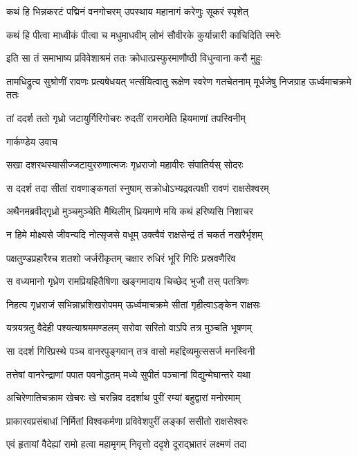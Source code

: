 \twolineshloka
{कथं हि भिन्नकरटं पद्मिनं वनगोचरम्}
{उपस्थाय महानागं करेणुः सूकरं स्पृशेत्}


\twolineshloka
{कथं हि पीत्वा माध्वीकं पीत्वा च मधुमाधवीम्}
{लोभं सौवीरके कुर्यान्नारी काचिदिति स्मरेः}


\twolineshloka
{इति सा तं समाभाष्य प्रविवेशाश्रमं ततः}
{क्रोधात्प्रस्फुरमाणौष्ठी विधुन्वाना करौ मुहुः}


तामधिद्रुत्य सुश्रोणीं रावणः प्रत्यषेधयत्
\twolineshloka
{भर्त्सयित्वातु रूक्षेण स्वरेण गतचेतनाम्}
{मूर्धजेषु निजग्राह ऊर्ध्वमाचक्रमे ततः}


\twolineshloka
{तां ददर्श ततो गृध्रो जटायुर्गिरिगोचरः}
{रुदतीं रामरामेति हियमाणां तपस्विनीम्}


\twolineshloka
{गार्कण्डेय उवाच}
{}


\twolineshloka
{सखा दशरथस्यासीज्जटायुररुणात्मजः}
{गृध्रराजो महावीरः संपातिर्यस् सोदरः}


\twolineshloka
{स ददर्श तदा सीतां रावणाङ्कगतां स्नुषाम्}
{सक्रोधोऽभ्यद्रवत्पक्षी रावणं राक्षसेश्वरम्}


\twolineshloka
{अथैनमब्रवीद्गृध्रो मुञ्चमुञ्चेति मैथिलीम्}
{ध्रियमाणे मयि कथं हरिष्यसि निशाचर}


\twolineshloka
{न हिमे मोक्ष्यसे जीवन्यदि नोत्सृजसे वधूम्}
{उक्त्वैवं राक्षसेन्द्रं तं चकर्त नखरैर्भृशम्}


\twolineshloka
{पक्षतुण्डप्रहारैश्च शतशो जर्जरीकृतम्}
{चक्षार रुधिरं भूरि गिरिः प्रस्रवणैरिव}


\twolineshloka
{स वध्यमानो गृध्रेण रामप्रियहितैषिणा}
{खङ्गमादाय चिच्छेद भुजौ तस् पतत्रिणः}


\twolineshloka
{निहत्य गृध्रराजं सभिन्नाभ्रशिखरोपमम्}
{ऊर्ध्वमाचक्रमे सीतां गृहीत्वाऽङ्केन राक्षसः}


\twolineshloka
{यत्रयत्रतु वैदेही पश्यत्याश्रममण्डलम्}
{सरोवा सरितो वाऽपि तत्र मुञ्चति भूषणम्}


\twolineshloka
{सा ददर्श गिरिप्रस्थे पञ्च वानरपुङ्गवान्}
{तत्र वासो महद्दिव्यमुत्ससर्ज मनस्विनी}


\twolineshloka
{तत्तेषां वानरेन्द्राणां पपात पवनोद्धतम्}
{मध्ये सुपीतं पञ्चानां विद्युन्मेघान्तरे यथा}


\twolineshloka
{अचिरेणातिचक्राम खेचरः खे चरन्निव}
{ददर्शाथ पुरीं रम्यां बहुद्वारां मनोरमाम्}


\twolineshloka
{प्राकारवप्रसंबाधां निर्मितां विश्वकर्मणा}
{प्रविवेशपुरीं लङ्कां ससीतो राक्षसेश्वरः}


\twolineshloka
{एवं हृतायां वैदेह्यां रामो हत्वा महामृगम्}
{निवृत्तो ददृशे दूराद्भ्रातरं लक्ष्मणं तदा}


